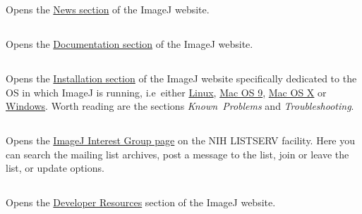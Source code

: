 Opens the \href{http://imagej.nih.gov/ij/notes.html}{News section}
of the ImageJ website.


\subsection{\protect{}\label{sub:Documentation...}}

Opens the \href{http://imagej.nih.gov/ij/docs/}{Documentation section}
of the ImageJ website.


\subsection{\protect{}\label{sub:Installation...}}

Opens the \href{http://imagej.nih.gov/ij/docs/install/}{Installation section}
of the ImageJ website specifically dedicated to the OS in which ImageJ
is running, i.e~either \href{http://imagej.nih.gov/ij/docs/install/linux.html}{Linux},
\href{http://imagej.nih.gov/ij/docs/install/mac.html}{Mac OS 9},
\href{http://imagej.nih.gov/ij/docs/install/osx.html}{Mac OS X} or
\href{http://imagej.nih.gov/ij/docs/install/windows.html}{Windows}.
Worth reading are the sections \emph{Known~Problems} and \emph{Troubleshooting}.


\subsection[\protect\userinterface{Mailing List\ldots{}}]{\protect{}\label{sub:List-Archives...}}

Opens the \href{https://list.nih.gov/archives/imagej.html}{ImageJ Interest Group page}
on the NIH LISTSERV facility. Here you can search the mailing list
archives, post a message to the list, join or leave the list, or update
options.


\subsection{\protect{}\label{sub:Help-Dev.Resources...}}

Opens the \href{http://imagej.nih.gov/ij/developer/index.html}{Developer Resources}
section of the ImageJ website. 


\subsection{\protect{}\label{sub:Plugins...}}

